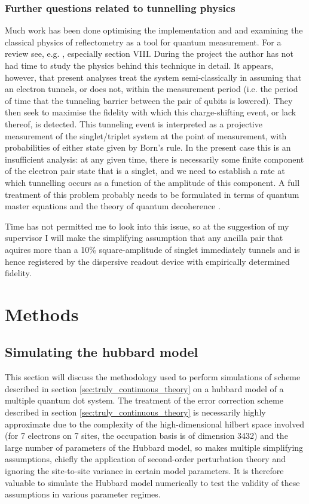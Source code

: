 \documentclass{report}
\begin{document}
\subsection{Further questions related to tunnelling physics} \label{sec:tunneling_question}

Much work has been done optimising the implementation and and examining the classical physics of reflectometry as a tool for quantum measurement. For a review see, e.g. \cite{Vigneau2023}, especially section VIII. During the project the author has not had time to study the physics behind this technique in detail. It appears, however, that present analyses treat the system semi-classically in assuming that an electron tunnels, or does not, within the measurement period (i.e. the period of time that the tunneling barrier between the pair of qubits is lowered). They then seek to maximise the fidelity with which this charge-shifting event, or lack thereof, is detected. This tunneling event is interpreted as a projective measurement of the singlet/triplet system at the point of measurement, with probabilities of either state given by Born's rule. In the present case this is an insufficient analysis: at any given time, there is necessarily some finite component of the electron pair state that is a singlet, and we need to establish a rate at which tunnelling occurs as a function of the amplitude of this component. A full treatment of this problem probably needs to be formulated in terms of quantum master equations and the theory of quantum decoherence \cite{Wiseman1996}.

Time has not permitted me to look into this issue, so at the suggestion of my supervisor I will make the simplifying assumption that any ancilla pair that aquires more than a 10\% square-amplitude of singlet immediately tunnels and is hence registered by the dispersive readout device with empirically determined fidelity.

\chapter{Methods} \label{chap:methods}

\section{Simulating the hubbard model}
This section will discuss the methodology used to perform simulations of scheme described in section \ref{sec:truly_continuous_theory} on a hubbard model of a multiple quantum dot system. The treatment of the error correction scheme described in section \ref{sec:truly_continuous_theory} is necessarily highly approximate due to the complexity of the high-dimensional hilbert space involved (for 7 electrons on 7 sites, the occupation basis is of dimension 3432) and the large number of parameters of the Hubbard model, so makes multiple simplifying assumptions, chiefly the application of second-order perturbation theory and ignoring the site-to-site variance in certain model parameters. It is therefore valuable to simulate the Hubbard model numerically to test the validity of these assumptions in various parameter regimes.
\end{document}
